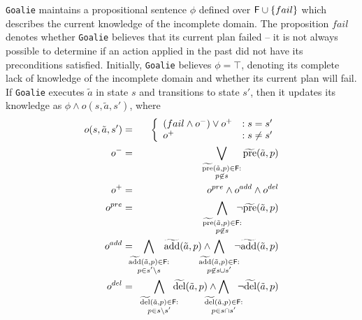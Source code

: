 \documentclass[letterpaper]{article}
\def\goalie{{\tt Goalie}}
\begin{document}
\goalie{} maintains a propositional sentence $\phi$ defined over ${\sf
F} \cup \{fail\}$ which describes the current knowledge of the
incomplete domain.  The proposition $fail$ denotes whether \goalie{} believes
that its current plan failed -- it is not always possible to determine if an
action applied in the past did not have its preconditions satisfied.  Initially,
\goalie{} believes $\phi = \top$, denoting its complete lack of knowledge of the
incomplete domain and whether its current plan will fail.    If \goalie{}
executes  $\tilde{a}$ in state $s$ and transitions to state $s'$, then it 
updates its knowledge as $\phi \wedge o(s, \tilde{a}, s')$, where
\noindent \begin{eqnarray}
o(s, \tilde{a}, s') &=& \left\{ \begin{array}{ll}
(fail \wedge o^-) \vee  o^+  &: s = s'\\
o^+  & : s \not= s'
\end{array}\right. \label{eqn:update}\\
o^- &=& \bigvee\limits_{\substack{\widetilde{\text{pre}}(\tilde{a},p) \in {\sf F}:\\ p \not\in s} } \widetilde{\text{pre}}(\tilde{a},p) \label{eqn:update1} \\
o^+ &=& o^{pre} \wedge o^{add} \wedge o^{del}\label{eqn:update2}\\
o^{pre} &=& \bigwedge\limits_{\substack{\widetilde{\text{pre}}(\tilde{a},p) \in
{\sf F}:\\ p \not\in s} }\hspace*{-0.25cm}\neg \widetilde{\text{pre}}(\tilde{a},p)\label{eqn:update3}  \\ o^{add} &=&  \hspace*{-.5cm}\bigwedge\limits_{\substack{\widetilde{\text{add}}(\tilde{a},p) \in {\sf F}:\\ p\in s'\backslash s} }\hspace*{-0.25cm}\widetilde{\text{add}}(\tilde{a},p)   \wedge  \hspace*{-0.5cm}\bigwedge\limits_{\substack{\widetilde{\text{add}}(\tilde{a},p) \in {\sf F}: \\ p \not\in  s\cup s'}} \hspace*{-0.25cm}\neg \widetilde{\text{add}}(\tilde{a},p)   \label{eqn:update4}\\
o^{del} &=& \hspace*{-.5cm} \bigwedge\limits_{\substack{\widetilde{\text{del}}(\tilde{a},p) \in {\sf F}: \\p \in s \backslash s'}} \hspace*{-0.25cm}\widetilde{\text{del}}(\tilde{a},p)  \wedge  \hspace*{-0.5cm}\bigwedge\limits_{\substack{\widetilde{\text{del}}(\tilde{a},p) \in {\sf F}:\\ p \in s\cap s'}} \hspace*{-0.25cm}\neg \widetilde{\text{del}}(\tilde{a},p)  \label{eqn:update5}
\end{eqnarray}
\end{document}
